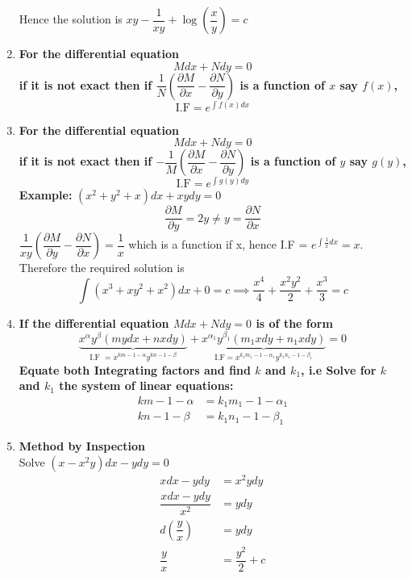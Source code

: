 \documentclass[a4paper, titlepage]{article}
\begin{document}
\begin{enumerate}[label=\textbf{\arabic*.}]
                Hence the solution is $xy - \dfrac{1}{xy} + \log \left(\dfrac{x}{y}\right) = c$
                \item \textbf{For the differential equation \[ Mdx + Ndy = 0 \] if it is not exact then if 
                $\dfrac{1}{N}\left(\dfrac{\partial M}{\partial x} - \dfrac{\partial N}{\partial y}\right)$ is a function of $x$ say $f(x)$, \[ \text{I.F} = e^{\int f(x)dx} \]}
                \item \textbf{For the differential equation \[ Mdx + Ndy = 0 \] if it is not exact then if
                $-\dfrac{1}{M}\left(\dfrac{\partial M}{\partial x} - \dfrac{\partial N}{\partial y}\right)$ is a function of $y$ say $g(y)$, \[ \text{I.F} = e^{\int g(y)dy} \]}
                \textbf{Example: }$(x^2 + y^2 + x)dx + xydy = 0$
                $$\dfrac{\partial M}{\partial y} = 2y \neq y = \dfrac{\partial N}{\partial x}$$
                $\dfrac{1}{xy} \left( \dfrac{\partial M}{\partial y} - \dfrac{\partial N}{\partial x} \right) = \dfrac{1}{x}$ which is a function if x, hence I.F = $e^{\int \frac{1}{x}dx} = x$. Therefore the required solution is \[ \displaystyle\int (x^3 + xy^2 + x^2)dx + 0 = c \implies \dfrac{x^4}{4} + \dfrac{x^2y^2}{2} + \dfrac{x^3}{3} = c \]
                \item \textbf{If the differential equation $Mdx + Ndy = 0$ is of the form $$\underbrace{x^\alpha y^\beta(mydx + nxdy)}_{\text{I.F $= x^{km - 1 - \alpha}y^{kn - 1 - \beta}$}} + \underbrace{x^{\alpha_1} y^{\beta_1}(m_1xdy + n_1xdy)}_{\text{I.F} = x^{k_1m_1 - 1 - \alpha_1} y^{k_1n_1 - 1 - \beta_1}} = 0$$
                Equate both Integrating factors and find $k$ and $k_1$, i.e
                Solve for $k$ and $k_1$ the system of linear equations:}
                \begin{align*}
                    km - 1 - \alpha &= k_1m_1 - 1 - \alpha_1 \\
                    kn - 1 - \beta &= k_1n_1 - 1 - \beta_1
                \end{align*}
                \item \textbf{Method by Inspection} \hfill \\
                Solve $(x - x^2y)dx - ydy = 0$ 
                \begin{align*}
                    xdx - ydy &= x^2ydy \\
                    \dfrac{xdx - ydy}{x^2} &= ydy \\
                    d\left( \dfrac{y}{x} \right) &= ydy \\
                    \dfrac{y}{x} &= \dfrac{y^2}{2} + c
                \end{align*} 
            \end{enumerate}
\end{document}
